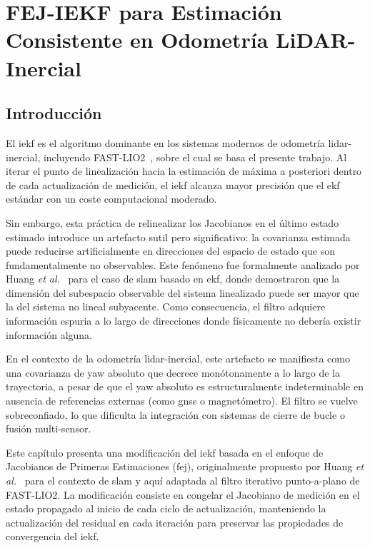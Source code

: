 \chapter{FEJ-IEKF para Estimación Consistente en Odometría LiDAR-Inercial}
\label{ch:fej-iekf}

\section{Introducción}
\label{sec:fej-introduccion}

El \gls{iekf} es el algoritmo dominante en los sistemas modernos de odometría
\gls{lidar}-inercial, incluyendo FAST-LIO2~\cite{xu2022fastlio2}, sobre el cual se
basa el presente trabajo. Al iterar el punto de linealización hacia la estimación
de máxima a posteriori dentro de cada actualización de medición, el \gls{iekf}
alcanza mayor precisión que el \gls{ekf} estándar con un coste computacional
moderado.

Sin embargo, esta práctica de relinealizar los Jacobianos en el último estado
estimado introduce un artefacto sutil pero significativo: la covarianza estimada
puede reducirse artificialmente en direcciones del espacio de estado que son
fundamentalmente no observables. Este fenómeno fue formalmente analizado por
Huang \emph{et al.}~\cite{huang2010observability} para el caso de \gls{slam}
basado en \gls{ekf}, donde demostraron que la dimensión del subespacio observable
del sistema linealizado puede ser mayor que la del sistema no lineal subyacente.
Como consecuencia, el filtro adquiere información espuria a lo largo de
direcciones donde físicamente no debería existir información alguna.

En el contexto de la odometría \gls{lidar}-inercial, este artefacto se manifiesta
como una covarianza de yaw absoluto que decrece monótonamente a lo largo de la
trayectoria, a pesar de que el yaw absoluto es estructuralmente indeterminable
en ausencia de referencias externas (como \gls{gnss} o magnetómetro). El filtro
se vuelve sobreconfiado, lo que dificulta la integración con sistemas de cierre
de bucle o fusión multi-sensor.

Este capítulo presenta una modificación del \gls{iekf} basada en el enfoque de
Jacobianos de Primeras Estimaciones (\gls{fej}), originalmente propuesto por
Huang \emph{et al.}~\cite{huang2010observability} para el contexto de \gls{slam}
y aquí adaptada al filtro iterativo punto-a-plano de FAST-LIO2. La modificación
consiste en congelar el Jacobiano de medición en el estado propagado al inicio
de cada ciclo de actualización, manteniendo la actualización del residual en cada
iteración para preservar las propiedades de convergencia del \gls{iekf}.

